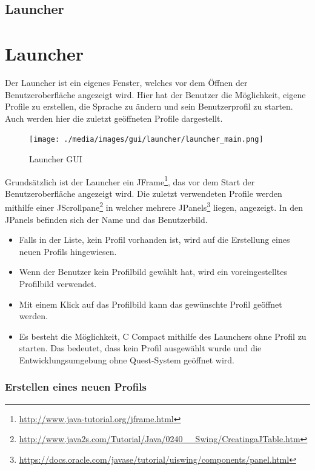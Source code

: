 \iffabian
	\subsection{Launcher}
	\label{sec:win-launcher}
\else
	\section{Launcher}
	\label{sec:win-launcher}
\fi
Der Launcher ist ein eigenes Fenster, welches vor dem Öffnen der Benutzeroberfläche angezeigt wird. Hier hat der Benutzer die Möglichkeit, eigene Profile zu erstellen, die Sprache zu ändern und sein Benutzerprofil zu starten. Auch werden hier die zuletzt geöffneten Profile dargestellt.

\begin{figure}[h] 
  \centering
     \texttt{[image: ./media/images/gui/launcher/launcher\_main.png]}
  \caption{Launcher GUI}
  \label{fig:launcher_GUI}
\end{figure}

Grundsätzlich ist der Launcher ein JFrame\footnote{\url{http://www.java-tutorial.org/jframe.html}}, das vor dem Start der Benutzeroberfläche angezeigt wird. Die zuletzt verwendeten Profile werden mithilfe einer JScrollpane\footnote{\url{http://www.java2s.com/Tutorial/Java/0240__Swing/CreatingaJTable.htm}}  in welcher mehrere JPanels\footnote{\url{https://docs.oracle.com/javase/tutorial/uiswing/components/panel.html}} liegen, angezeigt. In den JPanels befinden sich der Name und das Benutzerbild.

\begin{itemize}
\item Falls in der Liste, kein Profil vorhanden ist, wird auf die Erstellung eines neuen Profils hingewiesen.
\item Wenn der Benutzer kein Profilbild gewählt hat, wird ein voreingestelltes Profilbild verwendet.
\item Mit einem Klick auf das Profilbild kann das gewünschte Profil geöffnet werden.
\item Es besteht die Möglichkeit, C Compact mithilfe des Launchers ohne Profil zu starten. Das bedeutet, dass kein Profil ausgewählt wurde und die Entwicklungsumgebung ohne Quest-System geöffnet wird.
\end{itemize}

\iffabian
	\subsubsection*{Erstellen eines neuen Profils}
\else
